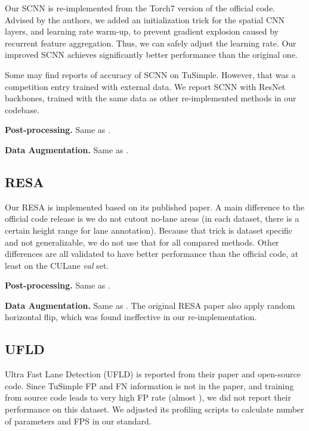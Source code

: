 \documentclass[10pt,twocolumn,letterpaper]{article}
\begin{document}
Our SCNN \cite{pan2018spatial} is re-implemented from the Torch7 version of the official code. Advised by the authors, we added an initialization trick for the spatial CNN layers, and learning rate warm-up, to prevent gradient explosion caused by recurrent feature aggregation. Thus, we can safely adjust the learning rate. Our improved SCNN achieves significantly better performance than the original one.

Some may find reports of  accuracy of SCNN on TuSimple. However, that was a competition entry trained with external data. We report SCNN with ResNet backbones, trained with the same data as other re-implemented methods in our codebase.

\noindent \textbf{Post-processing.} Same as .

\noindent \textbf{Data Augmentation.} Same as .

\subsection{RESA}
\label{subsec:resa}

Our RESA \cite{zheng2021resa} is implemented based on its published paper. A main difference to the official code release is we do not cutout no-lane areas (in each dataset, there is a certain height range for lane annotation). Because that trick is dataset specific and not generalizable, we do not use that for all compared methods. Other differences are all validated to have better performance than the official code, at least on the CULane \textit{val} set.

\noindent \textbf{Post-processing.} Same as .

\noindent \textbf{Data Augmentation.} Same as . The original RESA paper \cite{zheng2021resa} also apply random horizontal flip, which was found ineffective in our re-implementation.

\subsection{UFLD}
\label{subsec:ufld}

Ultra Fast Lane Detection (UFLD) \cite{qin2020ultra} is reported from their paper and open-source code. Since TuSimple FP and FN information is not in the paper, and training from source code leads to very high FP rate (almost ), we did not report their performance on this dataset. We adjusted its profiling scripts to calculate number of parameters and FPS in our standard.
\end{document}
